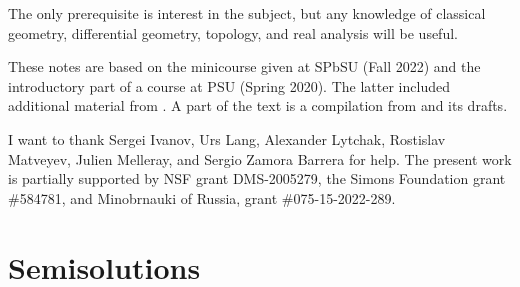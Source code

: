 \documentclass[twoside]{book}
\begin{document}
The only prerequisite is interest in the subject,
but any knowledge of classical geometry, differential geometry, topology, and real analysis will be useful. 

These notes are based on the minicourse given at SPbSU (Fall 2022) and the introductory part of a course at PSU (Spring 2020).
The latter included additional material from \cite{alexander-kapovitch-petrunin-2019,petrunin2020mnfld,nabutovsky}.
A part of the text is a compilation from \cite{alexander-kapovitch-petrunin-2019, alexander-kapovitch-petrunin-2025, petrunin-yashinski, petrunin-2022-PIGTIKAL, petrunin-zamorabarrera} and its drafts.

I want to thank
Sergei Ivanov,
Urs Lang,
Alexander Lytchak,
Rostislav Matveyev,
Julien Melleray,
and Sergio Zamora Barrera for help.
The present work is partially supported by NSF grant DMS-2005279,
the Simons Foundation grant \#584781,
and Minobrnauki of Russia, grant \#075-15-2022-289.

\thispagestyle{empty}
\tableofcontents
\thispagestyle{empty}






%

\backmatter

\chapter{Semisolutions}

{

\footnotesize
\begin{multicols}{2}







\end{multicols}
}


{\small\sloppy


\def\emph{\textit}

\printbibliography[heading=bibintoc]
\fussy
}
\end{document}
